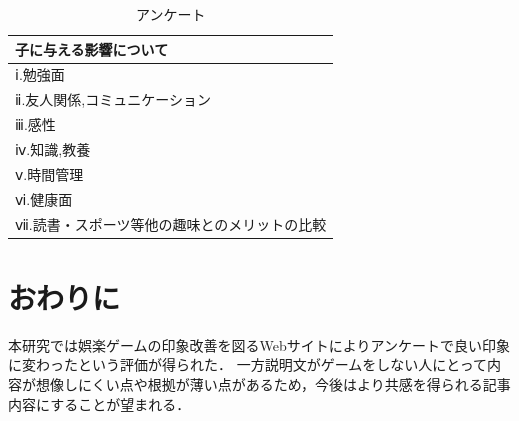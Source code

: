 \documentclass[twocolumn,10pt,a4j]{ltjsarticle}
\begin{document}
\begin{table}[h]
 \caption{アンケート}
 \label{table:SpeedOfLight}
 \centering
  \begin{tabular}{l}
  \hline
  子に与える影響について \\
   \hline \hline
   ⅰ.勉強面 \\
   ⅱ.友人関係,コミュニケーション\\
   ⅲ.感性\\
   ⅳ.知識,教養 \\
   ⅴ.時間管理   \\
   ⅵ.健康面 \\
   ⅶ.読書・スポーツ等他の趣味とのメリットの比較 \\
   \hline
  \end{tabular}
\end{table}









\section{おわりに}
本研究では娯楽ゲームの印象改善を図るWebサイトによりアンケートで良い印象に変わったという評価が得られた．
一方説明文がゲームをしない人にとって内容が想像しにくい点や根拠が薄い点があるため，今後はより共感を得られる記事内容にすることが望まれる．
\end{document}
